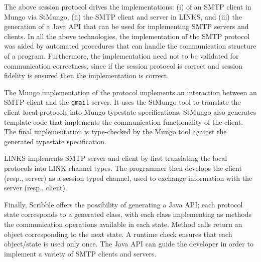 %


%

The above session protocol drives the implementations:
(i) of an SMTP client in Mungo via StMungo,
(ii) the SMTP client and server in LINKS, and
(iii) the generation of a Java API that can be used
for implementing SMTP servers and clients.
In all the above technologies,
the implementation of the SMTP protocol was
aided by automated procedures that can handle
the communication structure of a program. Furthermore,
the implementation need not to be validated for
communication correctness, since if the session protocol
is correct and session fidelity is ensured then
the implementation is correct.

The Mungo implementation of the protocol
implements an interaction between an SMTP client
and the \lstinline|gmail| server. It uses the StMungo
tool to translate the client local protocols into Mungo
typestate specifications. StMungo also generates template
code that implements the communication functionality of the client.
The final implementation is type-checked by the Mungo tool against
the generated typestate specification.

LINKS implements SMTP server and client by first translating
the local protocols into LINK channel types. The programmer
then develops the client (resp., server) as a session typed
channel, used to exchange information with the server (resp., client).

Finally, Scribble offers the possibility of generating a Java API;
each protocol state corresponds to a generated class, with each
class implementing as methods the communication operations available
in each state. Method calls return an object corresponding to the next state.
A runtime check ensures that each object/state is used only once.
The Java API can guide the developer in order to implement a variety
of SMTP clients and servers.